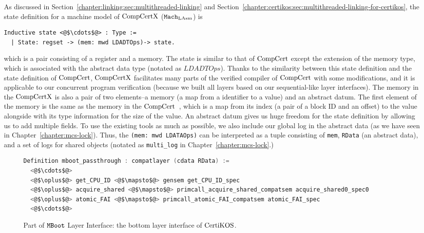 As discussed in Section~\ref{chapter:linking:sec:multithreaded-linking} and Section~\ref{chapter:certikos:sec:multithreaded-linking-for-certikos},
the state definition for a machine model of  $\mathrm{CompCertX}$ (${\mathrm{\texttt{Mach}}}_{\mathrm{LAsm}}$) is
\begin{lstlisting}
Inductive state <@$\cdots$@> : Type :=
  | State: regset -> (mem: mwd LDADTOps)-> state.
\end{lstlisting}
which is a pair consisting of  a register and a memory. 
The state is similar to that of $\mathrm{CompCert}$ except the extension of the memory type, which is associated with 
the abstract data type  (notated as $LDADTOps$).
Thanks to the similarity between this state definition and the state definition of $\mathrm{CompCert}$, 
$\mathrm{CompCertX}$ facilitates many parts of the verified compiler of $\mathrm{CompCert}$ with some modifications, 
and it is applicable to our concurrent program verification (because 
we built all layers based on our sequential-like layer interfaces).
The memory in the $\mathrm{CompCertX}$   is also a pair of two elements--a memory (a map from a identifier to a value) and an abstract datum. 
The first element of the memory is the same as the memory in the $\mathrm{CompCert}$~\cite{leroy08},
 which is a map from its index (a pair of a block ID and an offset) to the value alongside with its type information for the size of the value. 
An abstract datum gives us huge freedom for the state definition by allowing us to add multiple fields.
To use the existing tools as much as possible, 
we also include our global log in the abstract data (as we have seen in Chapter~\ref{chapter:mcs-lock}).
Thus, the \lstinline$(mem: mwd LDATAOps)$ can be interpreted as a tuple consisting of 
\lstinline$mem$, \lstinline$RData$ (an abstract data), and a set of logs for shared objects (notated as \lstinline$multi_log$ in
Chapter~\ref{chapter:mcs-lock}.)


\begin{figure}
\begin{lstlisting}[language=C]
Definition mboot_passthrough : compatlayer (cdata RData) :=
  <@$\cdots$@>
  <@$\oplus$@> get_CPU_ID <@$\mapsto$@> gensem get_CPU_ID_spec
  <@$\oplus$@> acquire_shared <@$\mapsto$@> primcall_acquire_shared_compatsem acquire_shared0_spec0
  <@$\oplus$@> atomic_FAI <@$\mapsto$@> primcall_atomic_FAI_compatsem atomic_FAI_spec
  <@$\cdots$@>
\end{lstlisting}
\caption{Part of ${\mathrm{\texttt{MBoot}}}$ Layer Interface: the bottom layer interface of $\mathrm{CertiKOS}$.}
\label{fig:chapter:certikos:bottom-layer-interface}
\end{figure}

